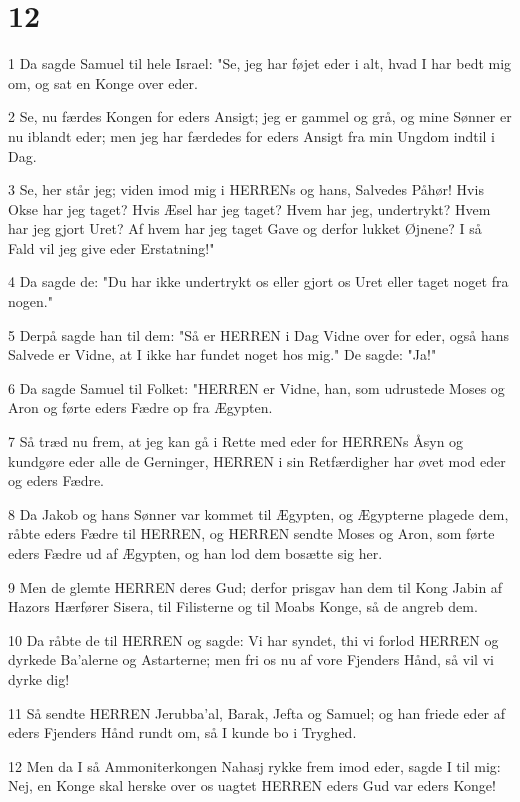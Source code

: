 \chapter{12}

\par 1 Da sagde Samuel til hele Israel: "Se, jeg har føjet eder i alt, hvad I har bedt mig om, og sat en Konge over eder.
\par 2 Se, nu færdes Kongen for eders Ansigt; jeg er gammel og grå, og mine Sønner er nu iblandt eder; men jeg har færdedes for eders Ansigt fra min Ungdom indtil i Dag.
\par 3 Se, her står jeg; viden imod mig i HERRENs og hans, Salvedes Påhør! Hvis Okse har jeg taget? Hvis Æsel har jeg taget? Hvem har jeg, undertrykt? Hvem har jeg gjort Uret? Af hvem har jeg taget Gave og derfor lukket Øjnene? I så Fald vil jeg give eder Erstatning!"
\par 4 Da sagde de: "Du har ikke undertrykt os eller gjort os Uret eller taget noget fra nogen."
\par 5 Derpå sagde han til dem: "Så er HERREN i Dag Vidne over for eder, også hans Salvede er Vidne, at I ikke har fundet noget hos mig." De sagde: "Ja!"
\par 6 Da sagde Samuel til Folket: "HERREN er Vidne, han, som udrustede Moses og Aron og førte eders Fædre op fra Ægypten.
\par 7 Så træd nu frem, at jeg kan gå i Rette med eder for HERRENs Åsyn og kundgøre eder alle de Gerninger, HERREN i sin Retfærdigher har øvet mod eder og eders Fædre.
\par 8 Da Jakob og hans Sønner var kommet til Ægypten, og Ægypterne plagede dem, råbte eders Fædre til HERREN, og HERREN sendte Moses og Aron, som førte eders Fædre ud af Ægypten, og han lod dem bosætte sig her.
\par 9 Men de glemte HERREN deres Gud; derfor prisgav han dem til Kong Jabin af Hazors Hærfører Sisera, til Filisterne og til Moabs Konge, så de angreb dem.
\par 10 Da råbte de til HERREN og sagde: Vi har syndet, thi vi forlod HERREN og dyrkede Ba'alerne og Astarterne; men fri os nu af vore Fjenders Hånd, så vil vi dyrke dig!
\par 11 Så sendte HERREN Jerubba'al, Barak, Jefta og Samuel; og han friede eder af eders Fjenders Hånd rundt om, så I kunde bo i Tryghed.
\par 12 Men da I så Ammoniterkongen Nahasj rykke frem imod eder, sagde I til mig: Nej, en Konge skal herske over os uagtet HERREN eders Gud var eders Konge!
